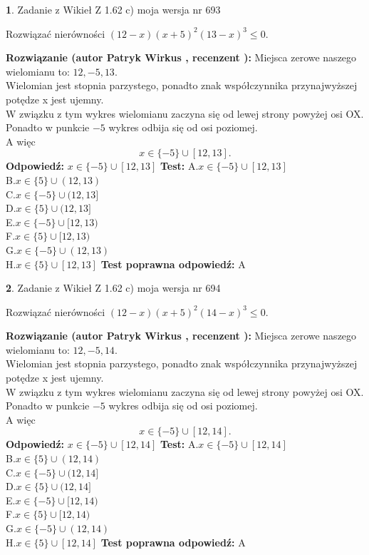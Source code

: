 \documentclass[12pt, a4paper]{article}
\theoremstyle{definition} %
\newtheorem{zad}{}
\newcommand{\zadStart}[1]{\begin{zad}#1\newline}
\newcommand{\zadStop}{\end{zad}}
\newcommand{\rozwStart}[2]{\noindent \textbf{Rozwiązanie (autor #1 , recenzent #2): }\newline}
\newcommand{\rozwStop}{\newline}
\newcommand{\odpStart}{\noindent \textbf{Odpowiedź:}\newline}
\newcommand{\odpStop}{\newline}
\newcommand{\testStart}{\noindent \textbf{Test:}\newline}
\newcommand{\testStop}{\newline}
\newcommand{\kluczStart}{\noindent \textbf{Test poprawna odpowiedź:}\newline}
\newcommand{\kluczStop}{\newline}
\begin{document}
\zadStart{Zadanie z Wikieł Z 1.62 c) moja wersja nr 693}

Rozwiązać nierówności $(12-x)(x+5)^{2}(13-x)^{3}\le0$.
\zadStop
\rozwStart{Patryk Wirkus}{}
Miejsca zerowe naszego wielomianu to: $12, -5, 13$.\\
Wielomian jest stopnia parzystego, ponadto znak współczynnika przy\linebreak najwyższej potędze x jest ujemny.\\ W związku z tym wykres wielomianu zaczyna się od lewej strony powyżej osi OX.\\
Ponadto w punkcie $-5$ wykres odbija się od osi poziomej.\\
A więc $$x \in \{-5\} \cup [12,13].$$
\rozwStop
\odpStart
$x \in \{-5\} \cup [12,13]$
\odpStop
\testStart
A.$x \in \{-5\} \cup [12,13]$\\
B.$x \in \{5\} \cup (12,13)$\\
C.$x \in \{-5\} \cup (12,13]$\\
D.$x \in \{5\} \cup (12,13]$\\
E.$x \in \{-5\} \cup [12,13)$\\
F.$x \in \{5\} \cup [12,13)$\\
G.$x \in \{-5\} \cup (12,13)$\\
H.$x \in \{5\} \cup [12,13]$
\testStop
\kluczStart
A
\kluczStop



\zadStart{Zadanie z Wikieł Z 1.62 c) moja wersja nr 694}

Rozwiązać nierówności $(12-x)(x+5)^{2}(14-x)^{3}\le0$.
\zadStop
\rozwStart{Patryk Wirkus}{}
Miejsca zerowe naszego wielomianu to: $12, -5, 14$.\\
Wielomian jest stopnia parzystego, ponadto znak współczynnika przy\linebreak najwyższej potędze x jest ujemny.\\ W związku z tym wykres wielomianu zaczyna się od lewej strony powyżej osi OX.\\
Ponadto w punkcie $-5$ wykres odbija się od osi poziomej.\\
A więc $$x \in \{-5\} \cup [12,14].$$
\rozwStop
\odpStart
$x \in \{-5\} \cup [12,14]$
\odpStop
\testStart
A.$x \in \{-5\} \cup [12,14]$\\
B.$x \in \{5\} \cup (12,14)$\\
C.$x \in \{-5\} \cup (12,14]$\\
D.$x \in \{5\} \cup (12,14]$\\
E.$x \in \{-5\} \cup [12,14)$\\
F.$x \in \{5\} \cup [12,14)$\\
G.$x \in \{-5\} \cup (12,14)$\\
H.$x \in \{5\} \cup [12,14]$
\testStop
\kluczStart
A
\kluczStop
\end{document}
